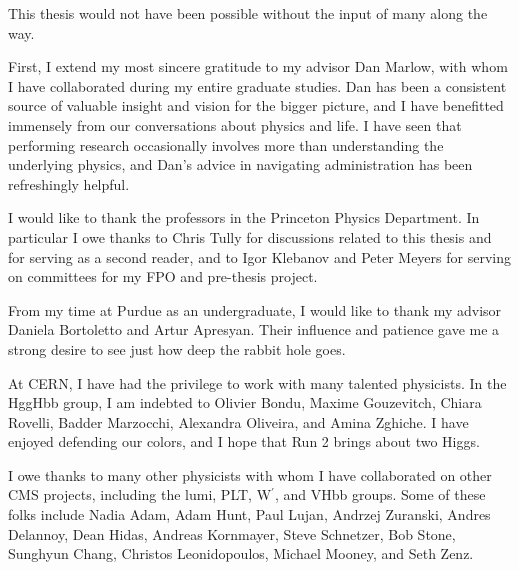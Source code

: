 This thesis would not have been possible without the input of many along the way.

First, I extend my most sincere gratitude to my advisor Dan Marlow, with whom I have collaborated
during my entire graduate studies.
Dan has been a consistent source of valuable insight and vision for the bigger picture, and
I have benefitted immensely from our conversations about physics and life.
I have seen that performing research occasionally involves
more than understanding the underlying physics,
and Dan's advice in navigating administration has been refreshingly helpful.

I would like to thank the professors in the Princeton Physics Department. In particular
I owe thanks to Chris Tully for discussions related to this thesis and for serving as a second reader,
and to Igor Klebanov and Peter Meyers for serving on committees for my FPO and pre-thesis project.

From my time at Purdue as an undergraduate, I would like to thank my advisor Daniela Bortoletto and
Artur Apresyan. Their influence and patience gave me a strong desire to
see just how deep the rabbit hole goes.

At CERN, I have had the privilege to work with many talented physicists. In the HggHbb group,
I am indebted to
Olivier Bondu, Maxime Gouzevitch, Chiara Rovelli, Badder Marzocchi, Alexandra Oliveira, and
Amina Zghiche. I have enjoyed defending our colors,
and I hope that Run 2 brings about two Higgs.

I owe thanks to many other physicists with whom I have collaborated on other CMS projects, including the
lumi, PLT, W$^\prime$, and VHbb groups. Some of these folks include
Nadia Adam, Adam Hunt, Paul Lujan, Andrzej Zuranski,
Andres Delannoy, Dean Hidas, Andreas Kornmayer, Steve Schnetzer, Bob Stone, 
Sunghyun Chang, Christos Leonidopoulos, Michael Mooney, and Seth Zenz.

